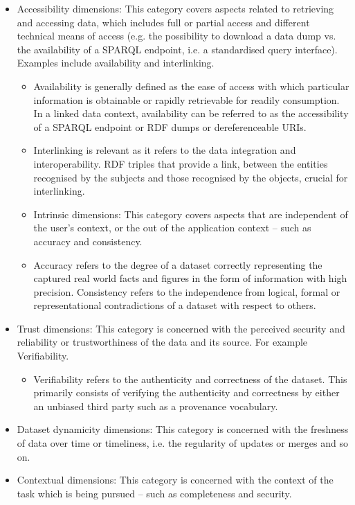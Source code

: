\documentclass{article}
\begin{document}
\begin{itemize}
\item Accessibility dimensions: This category covers aspects related to retrieving and accessing data, which includes full or partial access and different technical means of access (e.g. the possibility to download a data dump vs. the availability of a SPARQL endpoint, i.e. a standardised query interface). Examples include availability and interlinking.
\begin{itemize}
\item Availability is generally defined as the ease of access with which particular information is obtainable or rapidly retrievable for readily consumption. In a linked data context, availability can be referred to as the accessibility of a SPARQL endpoint or RDF dumps or dereferenceable URIs.
\item Interlinking is relevant as it refers to the data integration and interoperability.  RDF triples that provide a link, between the entities recognised by the subjects and those recognised by the objects, crucial for interlinking. 
\item Intrinsic dimensions: This category covers aspects that are independent of the user’s context, or the out of the application context – such as accuracy and consistency.
\item Accuracy refers to the degree of a dataset correctly representing the captured real world facts and figures in the form of information with high precision. 
Consistency refers to the independence from logical, formal or representational contradictions of a dataset with respect to others.
\end{itemize}
\item Trust dimensions: This category is concerned with the perceived security and reliability or trustworthiness of the data and its source. For example Verifiability.
\begin{itemize}
\item Verifiability refers to the authenticity and correctness of the dataset. This primarily consists of verifying the authenticity and correctness by either an unbiased third party such as a provenance vocabulary.
\end{itemize}
\item Dataset dynamicity dimensions: This category is concerned with the freshness of data over time or timeliness, i.e. the regularity of updates or merges and so on. 
\item Contextual dimensions: This category is concerned with the context of the task which is being pursued – such as completeness and security.

\end{itemize}
\end{document}

